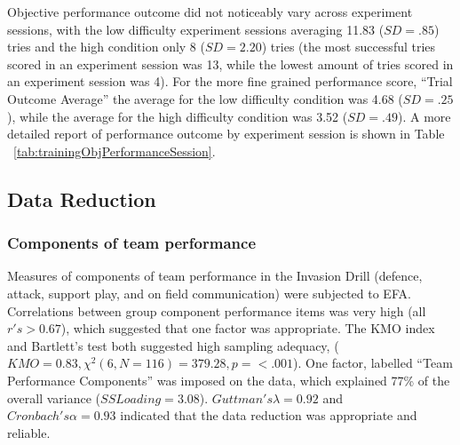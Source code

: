 \begin{CJK}{UTF8}{gbsn}
Objective performance outcome did not noticeably vary across experiment sessions, with the low difficulty experiment sessions averaging 11.83 ($SD = .85$) tries and the high condition only 8 ($SD = 2.20$) tries (the most successful tries scored in an experiment session was 13, while the lowest amount of tries scored in an experiment session was 4).  For the more fine grained performance score, ``Trial Outcome Average'' the average for the low difficulty condition was 4.68 ($SD = .25$), while the average for the high difficulty condition was 3.52 ($SD = .49$). A more detailed report of performance outcome by experiment session is shown in Table ~\ref{tab:trainingObjPerformanceSession}.













\subsection{Data Reduction}

\subsubsection{Components of team performance}
Measures of components of team performance in the Invasion Drill (defence, attack, support play, and on field communication) were subjected to EFA.  Correlations between group component performance items was very high (all $r's > 0.67$), which suggested that one factor was appropriate.  The KMO index and Bartlett's test both suggested high sampling adequacy, ($KMO =  0.83, \chi^2(6, N = 116) = 379.28, p = <.001$).  One factor, labelled ``Team Performance Components'' was imposed on the data, which explained 77\% of the overall variance ($SS Loading = 3.08$).  $Guttman's \lambda = 0.92$ and $Cronbach's \alpha = 0.93$ indicated that the data reduction was appropriate and reliable.


\end{CJK}
